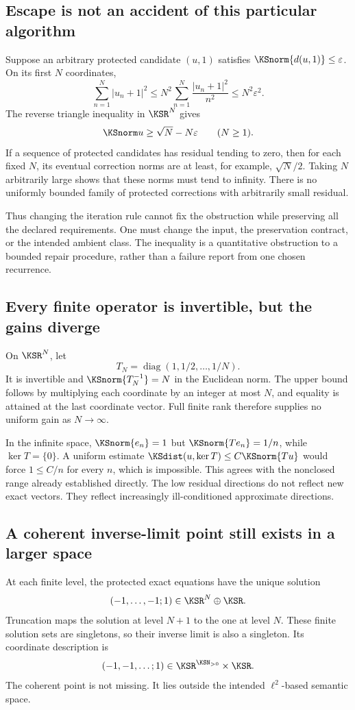 \subsection{Escape is not an accident of this particular algorithm}
Suppose an arbitrary protected candidate \((u,1)\) satisfies \(\KSnorm{d(u,1)}\le\varepsilon\). On its first \(N\) coordinates,
\[
 \sum_{n=1}^{N}|u_n+1|^2
 \le N^2\sum_{n=1}^{N}\frac{|u_n+1|^2}{n^2}
 \le N^2\varepsilon^2.
\]
The reverse triangle inequality in \(\KSR^N\) gives
\begin{equation}\label{KS:eq:escape-necessity}
 \KSnorm u\ge\sqrt N-N\varepsilon\qquad(N\ge1).
\end{equation}
If a sequence of protected candidates has residual tending to zero, then for each fixed \(N\), its eventual correction norms are at least, for example, \(\sqrt N/2\). Taking \(N\) arbitrarily large shows that these norms must tend to infinity. There is no uniformly bounded family of protected corrections with arbitrarily small residual.

Thus changing the iteration rule cannot fix the obstruction while preserving all the declared requirements. One must change the input, the preservation contract, or the intended ambient class. The inequality is a quantitative obstruction to a bounded repair procedure, rather than a failure report from one chosen recurrence.

\subsection{Every finite operator is invertible, but the gains diverge}
On \(\KSR^N\), let
\[
 T_N=\operatorname{diag}(1,1/2,\ldots,1/N).
\]
It is invertible and \(\KSnorm{T_N^{-1}}=N\) in the Euclidean norm. The upper bound follows by multiplying each coordinate by an integer at most \(N\), and equality is attained at the last coordinate vector. Full finite rank therefore supplies no uniform gain as \(N\to\infty\).

In the infinite space, \(\KSnorm{e_n}=1\) but \(\KSnorm{Te_n}=1/n\), while \(\ker T=\{0\}\). A uniform estimate
\(\KSdist(u,\ker T)\le C\KSnorm{Tu}\) would force \(1\le C/n\) for every \(n\), which is impossible. This agrees with the nonclosed range already established directly. The low residual directions do not reflect new exact vectors. They reflect increasingly ill-conditioned approximate directions.

\subsection{A coherent inverse-limit point still exists in a larger space}
At each finite level, the protected exact equations have the unique solution
\[
 (-1,\ldots,-1;1)\in\KSR^N\oplus\KSR.
\]
Truncation maps the solution at level \(N+1\) to the one at level \(N\). These finite solution sets are singletons, so their inverse limit is also a singleton. Its coordinate description is
\[
 (-1,-1,\ldots;1)\in\KSR^{\KSN_{>0}}\times\KSR.
\]
The coherent point is not missing. It lies outside the intended \(\ell^2\)-based semantic space.

